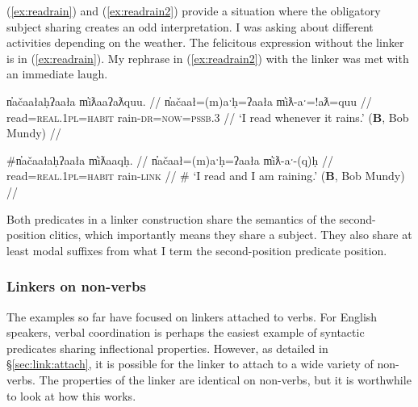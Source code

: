 (\ref{ex:readrain}) and (\ref{ex:readrain2}) provide a situation where the obligatory subject sharing creates an odd interpretation. I was asking about different activities depending on the weather. The felicitous expression without the linker is in (\ref{ex:readrain}). My rephrase in (\ref{ex:readrain2}) with the linker was met with an immediate laugh.

\ex \label{ex:readrain}
\begingl
\glpreamble n̓ačaałaḥʔaała m̓iƛaaʔaƛquu. //
\gla n̓ačaał=(m)aˑḥ=ʔaała m̓iƛ-aˑ=!aƛ=quu //
\glb read=\textsc{real.1pl}=\textsc{habit} rain-\textsc{dr}=\textsc{now}=\textsc{pssb.3} //
\glft `I read whenever it rains.' (\textbf{B}, Bob Mundy) //
\endgl
\xe

\ex \label{ex:readrain2}
\begingl
\glpreamble \#n̓ačaałaḥʔaała m̓iƛaaqḥ. //
\gla n̓ačaał=(m)aˑḥ=ʔaała m̓iƛ-aˑ-(q)ḥ //
\glb read=\textsc{real.1pl}=\textsc{habit} rain-\textsc{link} //
\glft \# `I read and I am raining.' (\textbf{B}, Bob Mundy) //
\endgl
\xe

Both predicates in a linker construction share the semantics of the second-position clitics, which importantly means they share a subject. They also share at least modal suffixes from what I term the second-position predicate position.


\begin{comment}
\ex \label{ex:someonespoke}
\begingl
\glpreamble ʔuušqḥʔaƛ ciqšiƛ.//
\gla ʔuuš-qḥ=ʔaƛ ciq-šiƛ //
\glb some-\textsc{link}=\textsc{now} speak-\textsc{mo} //
\glft `Someone spoke.' //
\endgl
\xe

\ex~ \label{ex:*someonespoke}
\begingl
\glpreamble *ʔuušqḥʔaƛ ciqšiƛḥ.//
\gla *ʔuuš-(q)ḥ=ʔaƛ ciq-šiƛ-(q)ḥ //
\glb *some-\textsc{link}=\textsc{now} speak-\textsc{mo}-\textsc{link} //
\glft Intended: `Someone spoke.' //
\endgl
\xe
\end{comment}


\subsubsection{Linkers on non-verbs} \label{sec:link:nonverb}

The examples so far have focused on linkers attached to verbs. For English speakers, verbal coordination is perhaps the easiest example of syntactic predicates sharing inflectional properties. However, as detailed in \S\ref{sec:link:attach}, it is possible for the linker to attach to a wide variety of non-verbs. The properties of the linker are identical on non-verbs, but it is worthwhile to look at how this works.

